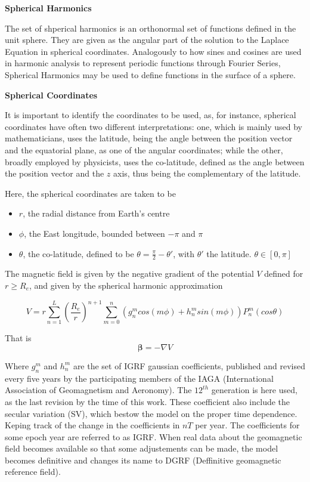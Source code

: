 \graphicspath{{figures/}}

{\bf Spherical Harmonics}

The set of shperical harmonics is an orthonormal set of functions defined in the unit sphere. They are given as the angular part of the solution to the Laplace Equation in spherical coordinates. Analogously  to how sines and cosines are used in harmonic analysis to represent periodic functions through Fourier Series, Spherical Harmonics may be used to define functions in the surface of a sphere.

{\bf Spherical Coordinates}

It is important to identify the coordinates to be used, as, for instance, spherical coordinates have often two different interpretations: one, which is mainly used by mathematicians, uses the latitude, being the angle between the position vector and the equatorial plane, as one of the angular coordinates; while the other, broadly employed by physicists, uses the co-latitude, defined as the angle between the position vector and the $z$ axis, thus being the complementary of the latitude. 

Here, the spherical coordinates are taken to be
\begin{itemize} 
\item[] $r$, the radial distance from Earth's centre
\item[] $\phi$, the East longitude, bounded between $-\pi$ and $\pi$
\item[] $\theta$, the co-latitude, defined to be $\theta = \frac{\pi}{2} - \theta'$, with $\theta'$ the latitude. $\theta \in \left[0,\pi\right]$ %
\end{itemize}

The magnetic field is given by the negative gradient of the potential $V$ defined for $r \geq R_e$, and given by the spherical harmonic approximation

\begin{equation} \label{eq:igrf_potential}
V = r \sum_{n=1}^{L} \left(\dfrac{R_e}{r}\right)^{n+1} \sum_{m=0}^{n} \left(g_n^m cos(m\phi) + h_n^m sin(m\phi)\right) P_n^m(cos\theta)
\end{equation}

That is
\begin{equation}
{\bm \beta} = -\nabla V
\end{equation}

Where $g_n^m$ and $h_n^m$ are the set of IGRF gaussian coefficients, published and revised every five years by the participating members of the IAGA (International Association
of Geomagnetism and Aeronomy). The $12^{th}$ generation is here used, as the last revision by the time of this work. These coefficient also include the secular variation (SV), which bestow the model on the proper time dependence. Keping track of the change in the coefficients in $nT$ per year. The coefficients  for some epoch year are referred to as IGRF. When real data about the geomagnetic field becomes available so that some adjustements can be made, the model becomes definitive and changes its name to DGRF (Deffinitive geomagnetic reference field).

